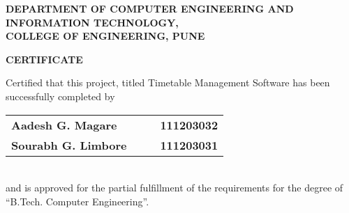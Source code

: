 % 
\thispagestyle{empty}
\linespread{2}
\begin{center}			%
	\Large{\bf{DEPARTMENT OF COMPUTER ENGINEERING AND\\  INFORMATION TECHNOLOGY,\\ 
	       COLLEGE OF ENGINEERING, PUNE\\}}	
\end{center}

\vspace{20pt}			%

\begin{center}
	\Large{\bf{CERTIFICATE\\}}
\end{center}

\vspace{20pt}

\linespread{1.5}			%
\selectfont
\large{
Certified that this project, titled Timetable Management Software
has been successfully completed by \\ 
\begin{table}[htbp]
	\begin{center}
	\begin{tabular}{ l c c l }
	\Large\bf{Aadesh G. Magare} & & & \Large\bf{111203032} \\ [0.3cm]
	\Large\bf{Sourabh G. Limbore} & & & \Large\bf{111203031} \\
	\end{tabular}
	\end{center}
	\end{table} \\
and is approved for the partial fulfillment of the requirements for the degree of 
``B.Tech. Computer Engineering''.
}

\vspace{60pt}

